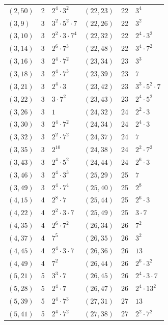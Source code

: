 \documentclass[11pt]{article}
\begin{document}
\begin{longtable}{@{}lrl@{\qquad}lrl@{}}
$(2,50)$ & 2 & $2^{4}\cdot 3^{2}$ & $(22,23)$ & 22 & $3^{4}$\\
$(3,9)$ & 3 & $3^{2}\cdot 5^{2}\cdot 7$ & $(22,26)$ & 22 & $3^{2}$\\
$(3,10)$ & 3 & $2^{2}\cdot 3\cdot 7^{4}$ & $(22,32)$ & 22 & $2^{4}\cdot 3^{2}$\\
$(3,14)$ & 3 & $2^{6}\cdot 7^{3}$ & $(22,48)$ & 22 & $3^{4}\cdot 7^{2}$\\
$(3,16)$ & 3 & $2^{4}\cdot 7^{2}$ & $(23,34)$ & 23 & $3^{3}$\\
$(3,18)$ & 3 & $2^{4}\cdot 7^{3}$ & $(23,39)$ & 23 & $7$\\
$(3,21)$ & 3 & $2^{4}\cdot 3$ & $(23,42)$ & 23 & $3^{3}\cdot 5^{2}\cdot 7$\\
$(3,22)$ & 3 & $3\cdot 7^{2}$ & $(23,43)$ & 23 & $2^{4}\cdot 5^{2}$\\
$(3,26)$ & 3 & $1$ & $(24,32)$ & 24 & $2^{2}\cdot 3$\\
$(3,30)$ & 3 & $2^{4}\cdot 7^{2}$ & $(24,34)$ & 24 & $2^{4}\cdot 3$\\
$(3,32)$ & 3 & $2^{2}\cdot 7^{2}$ & $(24,37)$ & 24 & $7$\\
$(3,35)$ & 3 & $2^{10}$ & $(24,38)$ & 24 & $2^{2}\cdot 7^{2}$\\
$(3,43)$ & 3 & $2^{4}\cdot 5^{2}$ & $(24,44)$ & 24 & $2^{6}\cdot 3$\\
$(3,46)$ & 3 & $2^{4}\cdot 3^{3}$ & $(25,29)$ & 25 & $7$\\
$(3,49)$ & 3 & $2^{4}\cdot 7^{4}$ & $(25,40)$ & 25 & $2^{8}$\\
$(4,15)$ & 4 & $2^{8}\cdot 7$ & $(25,44)$ & 25 & $2^{6}\cdot 3$\\
$(4,22)$ & 4 & $2^{2}\cdot 3\cdot 7$ & $(25,49)$ & 25 & $3\cdot 7$\\
$(4,35)$ & 4 & $2^{6}\cdot 7^{2}$ & $(26,34)$ & 26 & $7^{2}$\\
$(4,37)$ & 4 & $7^{5}$ & $(26,35)$ & 26 & $3^{2}$\\
$(4,45)$ & 4 & $2^{4}\cdot 3\cdot 7$ & $(26,36)$ & 26 & $13$\\
$(4,49)$ & 4 & $7^{2}$ & $(26,44)$ & 26 & $2^{6}\cdot 3^{2}$\\
$(5,21)$ & 5 & $3^{3}\cdot 7$ & $(26,45)$ & 26 & $2^{4}\cdot 3\cdot 7$\\
$(5,28)$ & 5 & $2^{4}\cdot 7$ & $(26,47)$ & 26 & $2^{4}\cdot 13^{2}$\\
$(5,39)$ & 5 & $2^{4}\cdot 7^{3}$ & $(27,31)$ & 27 & $13$\\
$(5,41)$ & 5 & $2^{4}\cdot 7^{2}$ & $(27,38)$ & 27 & $2^{2}\cdot 7^{2}$\\

\end{longtable}
\end{document}
